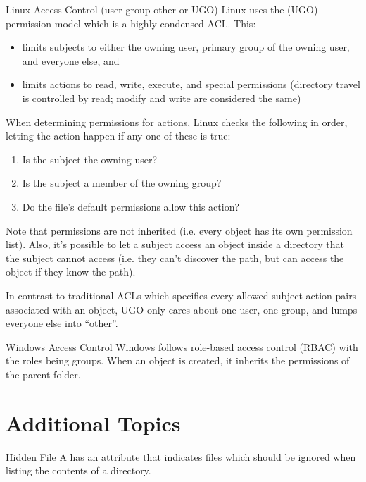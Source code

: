 \begin{exbox}{Linux Access Control (user-group-other or UGO)}{}
    Linux uses the  (UGO) permission model which is a highly condensed ACL. This:
    \begin{itemize}[noitemsep]
        \item limits subjects to either the owning user, primary group of the owning user, and everyone else, and
        \item limits actions to read, write, execute, and special permissions (directory travel is controlled by read; modify and write are considered the same)
    \end{itemize}
    When determining permissions for actions, Linux checks the following in order, letting the action happen if any one of these is true:
    \begin{enumerate}[noitemsep]
        \item Is the subject the owning user?
        \item Is the subject a member of the owning group?
        \item Do the file's default permissions allow this action?
    \end{enumerate}
    Note that permissions are not inherited (i.e. every object has its own permission list). Also, it's possible to let a subject access an object inside a directory that the subject cannot access (i.e. they can't discover the path, but can access the object if they know the path).

    In contrast to traditional ACLs which specifies every allowed subject action pairs associated with an object, UGO only cares about one user, one group, and lumps everyone else into ``other''.
\end{exbox}

\begin{exbox}{Windows Access Control}{}
    Windows follows role-based access control (RBAC) with the roles being groups. When an object is created, it inherits the permissions of the parent folder.
\end{exbox}

\section{Additional Topics}

\begin{dfnbox}{Hidden File}{}
    A  has an attribute that indicates files which should be ignored when listing the contents of a directory.
\end{dfnbox}

